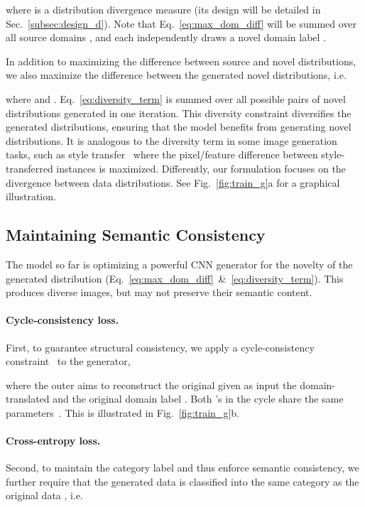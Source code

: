 \documentclass[runningheads]{llncs}
\begin{document}
where  is a distribution divergence measure (its design will be detailed in Sec.~\ref{subsec:design_d}). Note that Eq.~\eqref{eq:max_dom_diff} will be summed over all source domains , and each independently draws a novel domain label .

In addition to maximizing the difference between source and novel distributions, we also maximize the difference between the generated novel distributions, i.e.

where  and . Eq.~\eqref{eq:diversity_term} is summed over all possible pairs of novel distributions generated in one iteration. This diversity constraint diversifies the generated distributions, ensuring that the model benefits from generating  novel distributions. It is analogous to the diversity term in some image generation tasks, such as style transfer~\cite{li2017diversified} where the pixel/feature difference between style-transferred instances is maximized. Differently, our formulation focuses on the divergence between data distributions. See Fig.~\ref{fig:train_g}a for a graphical illustration.

\subsection{Maintaining Semantic Consistency} \label{subsec:maintain_semantic}
The model so far is optimizing a powerful CNN generator  for the novelty of the generated distribution (Eq.~\eqref{eq:max_dom_diff}~\&~\eqref{eq:diversity_term}). This produces diverse images, but may not preserve their semantic content.

\paragraph{Cycle-consistency loss.}
First, to guarantee structural consistency, we apply a cycle-consistency constraint~\cite{CycleGAN} to the generator,

where the outer  aims to reconstruct the original  given as input the domain-translated  and the original domain label . Both 's in the cycle share the same parameters~\cite{StarGAN}. This is illustrated in Fig.~\ref{fig:train_g}b.

\paragraph{Cross-entropy loss.}
Second, to maintain the category label and thus enforce semantic consistency, we further require that the generated data  is classified into the same category as the original data , i.e.
\end{document}
